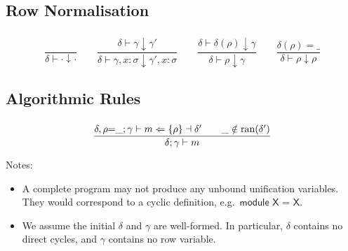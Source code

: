 \documentclass[10pt,a4paper]{article}
\newcommand\ff[1]{\ensuremath{\mathbin{\mathrm{#1\null}}}\xspace}
\newcommand\y[1]{\ensuremath{\mathsf{#1}}\xspace}
\newcommand\ran{\ff{ran}}
\newcommand\K[1]{\ensuremath{\textsf{#1}}}
\newcommand\note[1]{\noindent #1}
\begin{document}
\subsection*{Row Normalisation}

\subsubsection*{}

$$
\frac{
}{
  \delta \vdash {\cdot} \downarrow {\cdot}
}
\qquad
\frac{
  \delta \vdash \gamma \downarrow \gamma'
}{
  \delta \vdash \gamma,x{:}\sigma \downarrow \gamma',x{:}\sigma
}
\qquad
\frac{
  \delta \vdash \delta(\rho) \downarrow \gamma
}{
  \delta \vdash \rho \downarrow \gamma
}
\qquad
\frac{
  \delta(\rho) = \_
}{
  \delta \vdash \rho \downarrow \rho
}
$$


\clearpage
\subsection*{Algorithmic Rules}

\newcommand\anal{\Leftarrow}
\newcommand\synth{\Rightarrow}

\subsubsection*{}

$$
\frac{
  \delta,\rho{=}\_; \gamma \vdash m \anal \{\rho\} \dashv \delta'
  \qquad
  \_ \notin \ran(\delta')
}{
  \delta; \gamma \vdash m
}
$$

\note{
Notes:
\begin{itemize}
\item A complete program may not produce any unbound unification variables. They would correspond to a cyclic definition, e.g.\ \K{module X = X}.
\item We assume the initial $\delta$ and $\gamma$ are well-formed. In particular, $\delta$ contains no direct cycles, and $\gamma$ contains no row variable.
\end{itemize}
}


%
\end{document}
